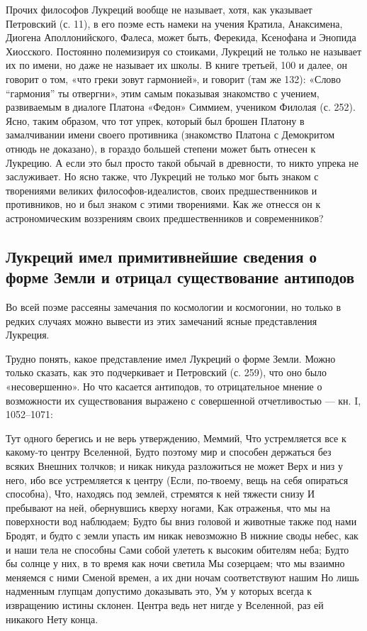 Прочих  философов Лукреций  вообще  не называет,  хотя, как  указывает
Петровский  (с.  11), в  его  поэме  есть  намеки на  учения  Кратила,
Анаксимена,  Диогена  Аполлонийского,  Фалеса, может  быть,  Ферекида,
Ксенофана  и Энопида  Хиосского.  Постоянно  полемизируя со  стоиками,
Лукреций не  только не называет  их по имени,  но даже не  называет их
школы. В  книге третьей,  100 и  далее, он говорит  о том,  «что греки
зовут  гармонией», и  говорит  (там же  132):  «Слово ``гармония''  ты
отвергни»,  этим самым  показывая  знакомство  с учением,  развиваемым
в  диалоге  Платона  «Федон»   Симмием,  учеником  Филолая  (с.  252).
Ясно,  таким образом,  что тот  упрек,  который был  брошен Платону  в
замалчивании имени своего противника  (знакомство Платона с Демокритом
отнюдь не  доказано), в гораздо  большей степени может быть  отнесен к
Лукрецию.  А  если  это  был  просто  такой  обычай  в  древности,  то
никто упрека  не заслуживает.  Но ясно также,  что Лукреций  не только
мог  быть  знаком  с творениями  великих  философов-идеалистов,  своих
предшественников и  противников, но и  был знаком с  этими творениями.
Как же отнесся он  к астрономическим воззрениям своих предшественников
и современников?

\subsection{Лукреций  имел примитивнейшие  сведения  о  форме Земли  и
отрицал существование антиподов}

Во всей поэме рассеяны замечания по космологии и космогонии, но только
в редких случаях  можно вывести из этих  замечаний ясные представления
Лукреция.

Трудно понять, какое представление имел  Лукреций о форме Земли. Можно
только сказать,  как это подчеркивает  и Петровский (с. 259),  что оно
было  «несовершенно».  Но  что касается  антиподов,  то  отрицательное
мнение  о   возможности  их   существования  выражено   с  совершенной
отчетливостью --- кн. I, 1052--1071:

Тут одного  берегись и не  верь утверждению, Меммий,  Что устремляется
все  к  какому-то  центру  Вселенной, Будто  поэтому  мир  и  способен
держаться без  всяких Внешних толчков;  и никак никуда  разложиться не
может  Верх  и низ  у  него,  ибо  все  устремляется к  центру  (Если,
по-твоему, вещь на себя опираться способна), Что, находясь под землей,
стремятся к ней  тяжести снизу И пребывают на  ней, обернувшись кверху
ногами, Как отраженья,  что мы на поверхности вод  наблюдаем; Будто бы
вниз головой и животные также под  нами Бродят, и будто с земли упасть
им никак невозможно В нижние своды  небес, как и наши тела не способны
Сами собой улететь  к высоким обителям неба; Будто бы  солнце у них, в
то время как ночи светила Мы созерцаем; что мы взаимно меняемся с ними
Сменой времен,  а их дни  ночам соответствуют нашим Но  лишь надменным
глупцам допустимо  доказывать это,  Ум у  которых всегда  к извращению
истины склонен.  Центра ведь  нет нигде у  Вселенной, раз  ей никакого
Нету конца.

